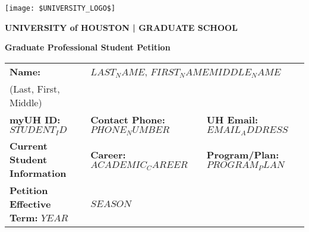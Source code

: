 \documentclass[12pt]{article}
\newcommand{\lastName}{$LAST_NAME$}
\newcommand{\firstName}{$FIRST_NAME$}
\newcommand{\middleName}{$MIDDLE_NAME$}
\newcommand{\studentID}{$STUDENT_ID$}
\newcommand{\phoneNumber}{$PHONE_NUMBER$}
\newcommand{\emailAddress}{$EMAIL_ADDRESS$}
\newcommand{\programPlan}{$PROGRAM_PLAN$}
\newcommand{\academicCareer}{$ACADEMIC_CAREER$}
\newcommand{\yearValue}{$YEAR$}
\newcommand{\seasonValue}{$SEASON$}
\begin{document}
\thispagestyle{empty}

\begin{center}
  \texttt{[image: \$UNIVERSITY\_LOGO\$]}
  \vspace{1em}
\end{center}

\begin{center}
  \textbf{\huge \color{gray} UNIVERSITY of \color{red} HOUSTON \color{darkgray} | GRADUATE SCHOOL}
\end{center}

\textbf{\LARGE Graduate Professional Student Petition} 
\vspace{1.5em}

\begin{tabular}{|p{}|p{}|p{}|}
\hline
\textbf{Name:} & \multicolumn{2}{l|}{\lastName, \firstName \middleName} \\
\scriptsize (Last, First, Middle) & \multicolumn{2}{l|}{} \\
\hline
\textbf{myUH ID:} \studentID & \textbf{Contact Phone:} \phoneNumber & \textbf{UH Email:} \emailAddress \\
\hline
\textbf{Current Student Information} & \textbf{Career:} \academicCareer & \textbf{Program/Plan:} \programPlan \\
\hline
\textbf{Petition Effective Term:} \yearValue & \multicolumn{2}{l|}{\seasonValue} \\
\hline
\end{tabular}
\vspace{0.5em}
\end{document}
